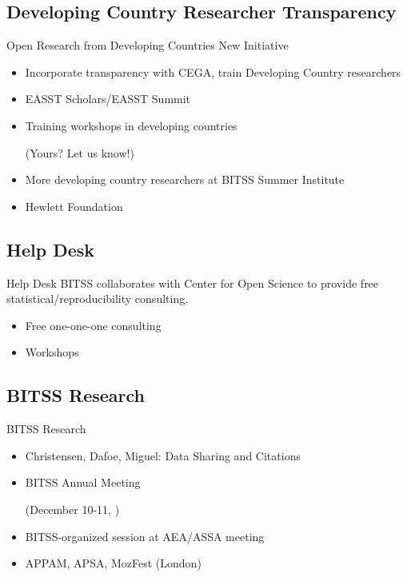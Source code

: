 \documentclass{beamer}
\begin{document}
\subsection{Developing Country Researcher Transparency}
\begin{frame}{Open Research from Developing Countries}
New Initiative
\begin{itemize}
\item Incorporate transparency with CEGA, train Developing Country researchers
\item EASST Scholars/EASST Summit
\item Training workshops in developing countries 

(Yours?  Let us know!)
\item More developing country researchers at BITSS Summer Institute
\item Hewlett Foundation
\end{itemize}


\end{frame}
\subsection{Help Desk}
\begin{frame}{Help Desk}
BITSS collaborates with Center for Open Science to provide free statistical/reproducibility consulting. \href{http://centerforopenscience.org/stats_consulting/}{}
\begin{itemize}
\item Free one-one-one consulting
\item Workshops
\end{itemize}
\end{frame}
\subsection{BITSS Research}
\begin{frame}{BITSS Research}
\begin{itemize}
\item Christensen, Dafoe, Miguel: Data Sharing and Citations
\item BITSS Annual Meeting 

(December 10-11, \href{http://www.bitss.org/2015-bitss-annual-meeting/}{})
\item BITSS-organized session at AEA/ASSA meeting
\item APPAM, APSA, MozFest (London)
\end{itemize}
\end{frame}
\end{document}
